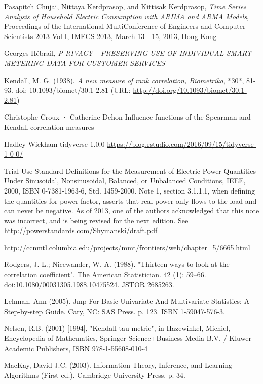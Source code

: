 \documentclass[11pt]{article}
\begin{document}
\begin{thebibliography}{9}

  Pasapitch Chujai, Nittaya Kerdprasop, and Kittisak Kerdprasop,
  \textit{Time Series Analysis of Household Electric Consumption with ARIMA and ARMA Models},
  Proceedings of the International MultiConference of Engineers and Computer Scientists 2013 Vol I,
  IMECS 2013, March 13 - 15, 2013, Hong Kong

  Georges Hébrail,
  \textit{P RIVACY - PRESERVING USE OF INDIVIDUAL SMART METERING DATA FOR CUSTOMER SERVICES}

    Kendall, M. G. (1938).
    \textit{A new measure of rank correlation, Biometrika}, *30*, 81-93.
    doi: 10.1093/biomet/30.1-2.81
    (URL: \url{http://doi.org/10.1093/biomet/30.1-2.81})

    Christophe Croux · Catherine Dehon
    Influence functions of the Spearman and Kendall correlation measures

    Hadley Wickham
    tidyverse 1.0.0
    \url{https://blog.rstudio.com/2016/09/15/tidyverse-1-0-0/}

    Trial-Use Standard Definitions for the Measurement of Electric Power Quantities Under Sinusoidal, Nonsinusoidal, Balanced, or Unbalanced Conditions, IEEE, 2000, ISBN 0-7381-1963-6, Std. 1459-2000. Note 1, section 3.1.1.1, when defining the quantities for power factor, asserts that real power only flows to the load and can never be negative. As of 2013, one of the authors acknowledged that this note was incorrect, and is being revised for the next edition. See \url{http://powerstandards.com/Shymanski/draft.pdf}

    \url{http://ccnmtl.columbia.edu/projects/mmt/frontiers/web/chapter_5/6665.html}

Rodgers, J. L.; Nicewander, W. A. (1988). "Thirteen ways to look at the correlation coefficient". The American Statistician. 42 (1): 59–66. doi:10.1080/00031305.1988.10475524. JSTOR 2685263.

 Lehman, Ann (2005).
 Jmp For Basic Univariate And Multivariate Statistics: A Step-by-step Guide. Cary, NC: SAS Press. p. 123. ISBN 1-59047-576-3.

 Nelsen, R.B. (2001) [1994], "Kendall tau metric", in Hazewinkel, Michiel, Encyclopedia of Mathematics, Springer Science+Business Media B.V. / Kluwer Academic Publishers, ISBN 978-1-55608-010-4

 MacKay, David J.C. (2003). Information Theory, Inference, and Learning Algorithms (First ed.). Cambridge University Press. p. 34. 

\end{thebibliography}
\end{document}
